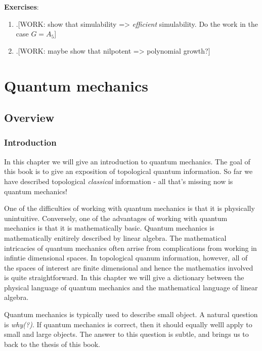 \documentclass{article}
\theoremstyle{definition}
\newcommand{\0}{\left|0\right>}
\newcommand{\1}{\left|1\right>}
\numberwithin{figure}{section}
\begin{document}
\large \textbf{Exercises}:\normalsize

\begin{enumerate}[\thesection .1.]

\item .[WORK: show that simulability => \textit{efficient} simulability. Do the work in the case $G=A_5$]

\item .[WORK: maybe show that nilpotent => polynomial growth?]

\end{enumerate}

\section{Quantum mechanics}

\subsection{Overview}

\subsubsection{Introduction}

In this chapter we will give an introduction to quantum mechanics. The goal of this book is to give an exposition of topological quantum information. So far we have described topological \textit{classical} information - all that's missing now is quantum mechanics!

One of the difficulties of working with quantum mechanics is that it is physically unintuitive. Conversely, one of the advantages of working with quantum mechanics is that it is mathematically basic. Quantum mechanics is mathematically enitirely described by linear algebra. The mathematical intricacies of quantum mechanics often arrise from complications from working in infintie dimensional spaces. In topological quanum information, however, all of the spaces of interest are finite dimensional and hence the mathematics involved is quite straightforward. In this chapter we will give a dictionary between the physical language of quantum mechanics and the mathematical language of linear algebra.

Quantum mechanics is typically used to describe small object. A natural question is \textit{why(?)}. If quantum mechanics is correct, then it should equally welll apply to small and large objects. The answer to this question is subtle, and brings us to back to the thesis of this book.
\end{document}
